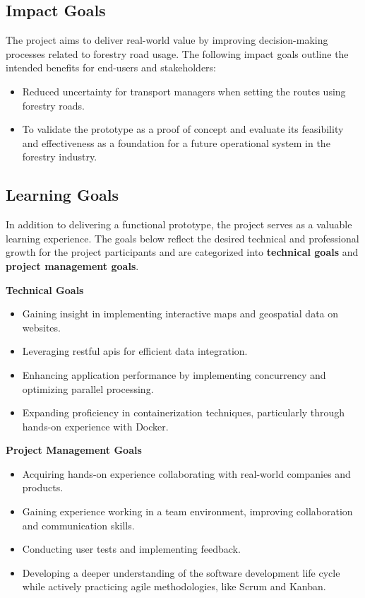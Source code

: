 \subsection{Impact Goals}\label{subsec:req:impactgoals}

The project aims to deliver real-world value by improving decision-making processes related to forestry road usage. The following impact goals outline the intended benefits for end-users and stakeholders:

\begin{itemize}
    \item Reduced uncertainty for transport managers when setting the routes using forestry roads.
    \item To validate the prototype as a proof of concept and evaluate its feasibility and effectiveness as a foundation for a future operational system in the forestry industry.
\end{itemize}

\subsection{Learning Goals}\label{subsec:req:learninggoals}

In addition to delivering a functional prototype, the project serves as a valuable learning experience. The goals below reflect the desired technical and professional growth for the project participants and are categorized into \textbf{technical goals} and \textbf{project management goals}.

\textbf{Technical Goals}
\begin{itemize}
    \item Gaining insight in implementing interactive maps and geospatial data on websites.
    \item Leveraging \acrshort{rest}ful \acrshort{api}s for efficient data integration.
    \item Enhancing application performance by implementing concurrency and optimizing parallel processing.
    \item Expanding proficiency in containerization techniques, particularly through hands-on experience with Docker.
\end{itemize}

\textbf{Project Management Goals}
\begin{itemize}
    \item Acquiring hands-on experience collaborating with real-world companies and products.
    \item Gaining experience working in a team environment, improving collaboration and communication skills.
    \item Conducting user tests and implementing feedback. 
    \item Developing a deeper understanding of the software development life cycle while actively practicing agile methodologies, like Scrum and Kanban.
\end{itemize}

